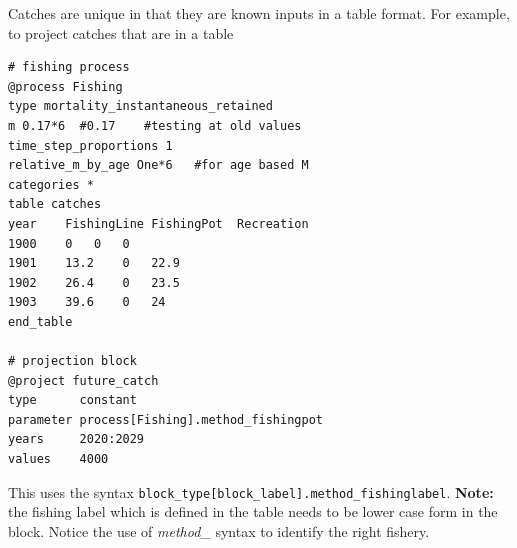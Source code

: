 Catches are unique in that they are known inputs in a table format. For example, to project catches that are in a table

{\small{\begin{verbatim}
# fishing process
@process Fishing
type mortality_instantaneous_retained
m 0.17*6  #0.17    #testing at old values
time_step_proportions 1
relative_m_by_age One*6   #for age based M
categories *
table catches
year	FishingLine	FishingPot	Recreation
1900	0	0	0
1901	13.2	0	22.9
1902	26.4	0	23.5
1903	39.6	0	24
end_table

# projection block
@project future_catch
type      constant
parameter process[Fishing].method_fishingpot
years     2020:2029
values    4000
\end{verbatim}}}

This uses the syntax \texttt{block\_type[block\_label].method\_fishinglabel}. \textbf{Note:} the fishing label which is defined in the table needs to be lower case form in the  block. Notice the use of \textit{method\_} syntax to identify the right fishery.
